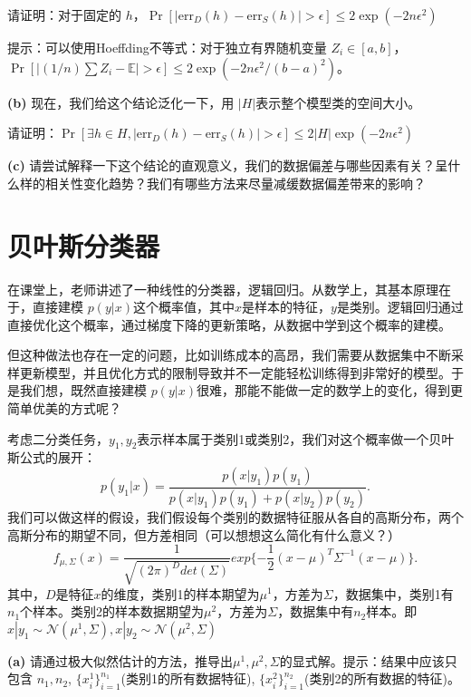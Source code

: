 \documentclass{article}
\begin{document}
请证明：对于固定的 $h$，$\Pr [|\text{err}_D(h) - \text{err}_S(h)| > \epsilon] \leq 2 \exp(-2n\epsilon^2)$

提示：可以使用Hoeffding不等式：对于独立有界随机变量 \( Z_i \in [a,b] \)，\( \Pr[|(1/n)\sum Z_i - \mathbb{E}| > \epsilon] \leq 2 \exp(-2n\epsilon^2 / (b-a)^2) \)。

\noindent \textbf{(b)}
现在，我们给这个结论泛化一下，用 $|H|$表示整个模型类的空间大小。

请证明：$\Pr [\exists h \in H, |\text{err}_D(h) - \text{err}_S(h)| > \epsilon] \leq 2|H| \exp(-2n\epsilon^2)$

\noindent \textbf{(c)}
请尝试解释一下这个结论的直观意义，我们的数据偏差与哪些因素有关？呈什么样的相关性变化趋势？我们有哪些方法来尽量减缓数据偏差带来的影响？

\section{贝叶斯分类器}
在课堂上，老师讲述了一种线性的分类器，逻辑回归。从数学上，其基本原理在于，直接建模 $p(y | x)$这个概率值，其中$x$是样本的特征，$y$是类别。逻辑回归通过直接优化这个概率，通过梯度下降的更新策略，从数据中学到这个概率的建模。

但这种做法也存在一定的问题，比如训练成本的高昂，我们需要从数据集中不断采样更新模型，并且优化方式的限制导致并不一定能轻松训练得到非常好的模型。于是我们想，既然直接建模 $p(y | x)$很难，那能不能做一定的数学上的变化，得到更简单优美的方式呢？

考虑二分类任务，$y_1, y_2$表示样本属于类别1或类别2，我们对这个概率做一个贝叶斯公式的展开：
\begin{equation}
    p(y_1 | x) = \frac{p(x|y_1) p (y_1)}{p(x|y_1)p(y_1) + p(x|y_2)p(y_2)}.
\end{equation}
我们可以做这样的假设，我们假设每个类别的数据特征服从各自的高斯分布，两个高斯分布的期望不同，但方差相同（可以想想这么简化有什么意义？）
\begin{equation}
    f_{\mu, \Sigma}(x) = \frac{1}{\sqrt{(2\pi)^Ddet(\Sigma)}}exp\{-\frac{1}{2}(x - \mu)^T \Sigma^{-1}(x - \mu)\}.
\end{equation}
其中，$D$是特征$x$的维度，类别1的样本期望为$\mu^1$，方差为$\Sigma$，数据集中，类别1有$n_1$个样本。类别2的样本数据期望为$\mu^2$，方差为$\Sigma$，数据集中有$n_2$样本。即 $x | y_1 \sim \mathcal{N}(\mu^1, \Sigma), x | y_2 \sim \mathcal{N}(\mu^2, \Sigma)$

\noindent \textbf{(a)}
请通过极大似然估计的方法，推导出$\mu^1, \mu^2, \Sigma$的显式解。提示：结果中应该只包含 $n_1, n_2$, $\{x_i^1\}_{i=1}^{n_1}$(类别1的所有数据特征), $\{x_i^2\}_{i=1}^{n_2}$(类别2的所有数据的特征)。
\end{document}

